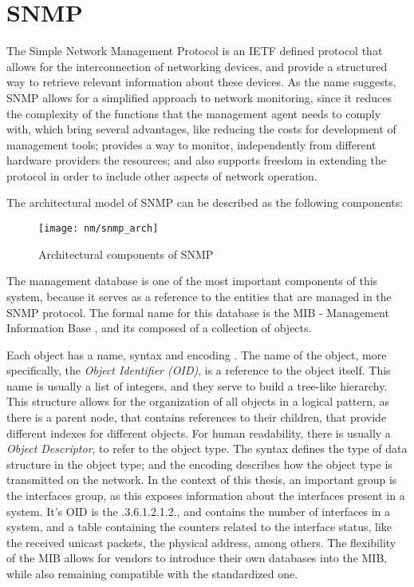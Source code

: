 \section {SNMP}

The Simple Network Management Protocol is an IETF defined protocol that allows for the interconnection of networking devices, and provide a structured way to retrieve relevant information about these devices. As the name suggests,
SNMP allows for a simplified approach to network monitoring, since it reduces the complexity of the functions that the management agent needs to comply with, which bring several advantages, like reducing
the costs for development of management tools; provides a way to monitor, independently from different hardware providers the resources; and also supports freedom in extending the protocol in order to include other aspects of 
network operation. \cite{CITE - RFC 1157} %
\par  The architectural model of SNMP can be described as the following components:
    
\begin{figure} [!htbp]
    \texttt{[image: nm/snmp\_arch]}
    \caption{Architectural components of SNMP}
\end{figure}

The management database is one of the most important components of this system, because it serves as a reference to the entities that are managed in the SNMP protocol. The formal name for this database is the MIB - Management 
Information Base \cite {CITE - RFC 1155}, and its composed of a collection of objects.

\par Each object has a name, syntax and encoding \cite {CITE - RFC 1156}. The name of the object, more specifically, the \textit {Object Identifier (OID)}, is a reference to the object itself. This name is usually a 
list of integers, and they serve to build a tree-like hierarchy. This structure allows for the organization of all objects in a logical pattern, as there is a parent node, that contains references to their children, 
that provide different indexes for different objects. For human readability, there is usually a \textit {Object Descriptor}, to refer to the object type. The syntax defines the type of data structure in the object type; and 
the encoding describes how the object type is transmitted on the network. In the context of this thesis, an important group is the interfaces group, as this exposes information about the interfaces present in a system. It's OID 
is the .3.6.1.2.1.2., and contains the number of interfaces in a system, and a table containing the counters related to the interface status, like the received unicast packets, the physical address, among others. The flexibility of
the MIB allows for vendors to introduce their own databases into the MIB, while also remaining compatible with the standardized one.


